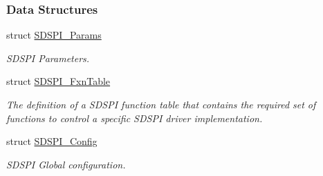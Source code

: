 \subsubsection*{Data Structures}
\begin{DoxyCompactItemize}
\item 
struct \hyperlink{struct_s_d_s_p_i___params}{S\+D\+S\+P\+I\+\_\+\+Params}
\begin{DoxyCompactList}\small\item\em S\+D\+S\+P\+I Parameters. \end{DoxyCompactList}\item 
struct \hyperlink{struct_s_d_s_p_i___fxn_table}{S\+D\+S\+P\+I\+\_\+\+Fxn\+Table}
\begin{DoxyCompactList}\small\item\em The definition of a S\+D\+S\+P\+I function table that contains the required set of functions to control a specific S\+D\+S\+P\+I driver implementation. \end{DoxyCompactList}\item 
struct \hyperlink{struct_s_d_s_p_i___config}{S\+D\+S\+P\+I\+\_\+\+Config}
\begin{DoxyCompactList}\small\item\em S\+D\+S\+P\+I Global configuration. \end{DoxyCompactList}\end{DoxyCompactItemize}
